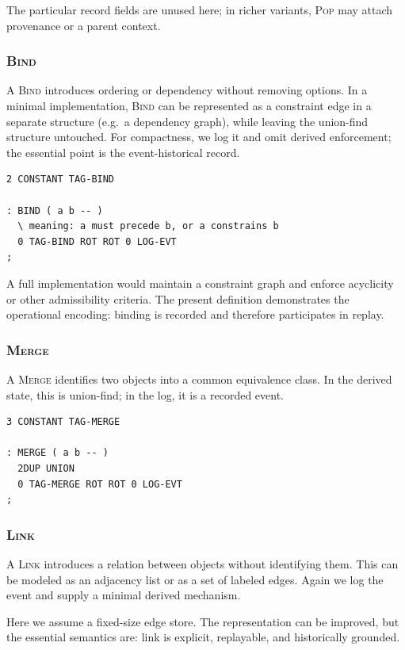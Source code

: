 \documentclass[11pt]{article}
\begin{document}
The particular record fields are unused here; in richer variants, \textsc{Pop}
may attach provenance or a parent context.

\subsubsection{\textsc{Bind}}

A \textsc{Bind} introduces ordering or dependency without removing options. In a
minimal implementation, \textsc{Bind} can be represented as a constraint edge in
a separate structure (e.g.\ a dependency graph), while leaving the union-find
structure untouched. For compactness, we log it and omit derived enforcement;
the essential point is the event-historical record.

\begin{verbatim}
2 CONSTANT TAG-BIND

: BIND ( a b -- )
  \ meaning: a must precede b, or a constrains b
  0 TAG-BIND ROT ROT 0 LOG-EVT
;
\end{verbatim}

A full implementation would maintain a constraint graph and enforce acyclicity
or other admissibility criteria. The present definition demonstrates the
operational encoding: binding is recorded and therefore participates in replay.

\subsubsection{\textsc{Merge}}

A \textsc{Merge} identifies two objects into a common equivalence class. In the
derived state, this is union-find; in the log, it is a recorded event.

\begin{verbatim}
3 CONSTANT TAG-MERGE

: MERGE ( a b -- )
  2DUP UNION
  0 TAG-MERGE ROT ROT 0 LOG-EVT
;
\end{verbatim}

\subsubsection{\textsc{Link}}

A \textsc{Link} introduces a relation between objects without identifying them.
This can be modeled as an adjacency list or as a set of labeled edges. Again we
log the event and supply a minimal derived mechanism.

Here we assume a fixed-size edge store. The representation can be improved, but
the essential semantics are: link is explicit, replayable, and historically
grounded.
\end{document}
